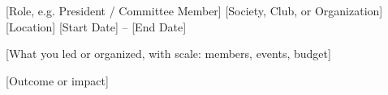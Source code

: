 

\begin{cventries}

  \cventry
    {[Role, e.g. President / Committee Member]} %
    {[Society, Club, or Organization]} %
    {[Location]} %
    {[Start Date] -- [End Date]} %
    {
      \begin{cvitems}
        \item {[What you led or organized, with scale: members, events, budget]}
        \item {[Outcome or impact]}
      \end{cvitems}
    }

\end{cventries}
